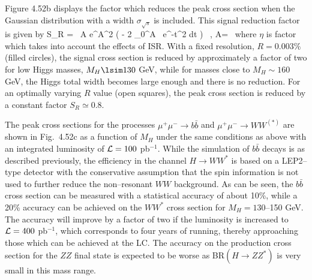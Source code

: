 Figure 4.52b displays the factor which reduces the peak cross section when the 
Gaussian distribution with a width $\sigma_{\sqrt s}$ is included. This 
signal reduction factor is given by
\beq
S_R = \eta \, A e^{A^2} \left( \sqrt \pi - 2 \int_0^A \, e^{-t^2} {\rm d}t
\right) \ , \quad A=   \, 
\eeq
where $\eta$ is factor which takes into account the effects of ISR. With a 
fixed resolution, $R = 0.003\%$ (filled circles), the signal cross section is 
reduced by approximately a factor of two for low Higgs masses, $M_H \lsim 130$ 
GeV, while for masses close to $M_H \sim 160$ GeV, the Higgs total width 
becomes large enough and there is no reduction.  For an optimally varying $R$ 
value (open squares), the peak cross section is reduced by a constant factor 
$S_R \simeq 0.8$.\s 

\begin{figure}[h!]
\begin{center}
\vspace*{-1.cm}
\end{center}  
\vspace*{-.3cm}
\end{figure}

The peak cross sections for the processes $\mu^+ \mu^- \to b\bar b$ and $\mu^+
\mu^- \to WW^{(*)}$ are shown in Fig.~4.52c as a function of $M_H$ under the
same conditions  as above with an integrated luminosity of ${\cal L}=100$ pb$^{
-1}$. While the simulation of $b\bar b$ decays is as described previously, the
efficiency in the channel $H\to WW^*$ is based on a LEP2--type detector with the
conservative assumption that the spin information is not used to further reduce
the non--resonant $WW$ background.  As can be seen, the $b\bar b$ cross section
can be measured with a statistical accuracy of about 10\%, while a 20\%
accuracy can be achieved on the $WW^*$ cross section for $M_H=130$--150 GeV.
The accuracy will improve by a factor of two if the luminosity is increased to
${\cal L}=400$ pb$^{-1}$, which corresponds to four years of running, thereby
approaching those which can be achieved at the LC. The accuracy on the 
production cross section for the $ZZ$ final state is expected to be worse as 
BR$(H\to ZZ^*)$ is very small in this mass range. \s  

